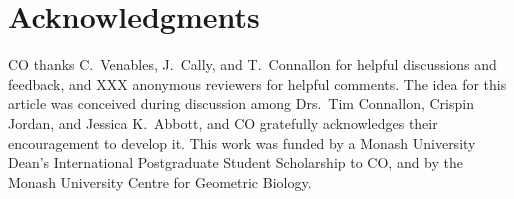 \documentclass{article}
\begin{document}



\section*{Acknowledgments}
CO thanks C.~Venables, J.~Cally, and T.~Connallon for helpful discussions and feedback, and XXX anonymous reviewers for helpful comments. The idea for this article was conceived during discussion among Drs.~Tim Connallon, Crispin Jordan, and Jessica K.~Abbott, and CO gratefully acknowledges their encouragement to develop it. This work was funded by a Monash University Dean's International Postgraduate Student Scholarship to CO, and by the Monash University Centre for Geometric Biology.

\newpage{}





\end{document}
